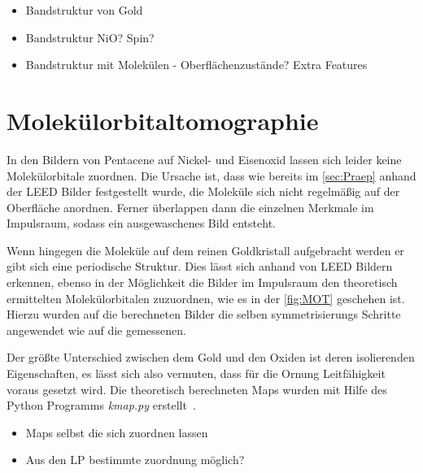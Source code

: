         \begin{itemize}
            \item Bandstruktur von Gold
            \item Bandstruktur NiO? Spin?
            \item Bandstruktur mit Molekülen - Oberflächenzustände? Extra Features
        \end{itemize}

    \section{Molekülorbitaltomographie}
        In den Bildern von Pentacene auf Nickel- und Eisenoxid lassen sich leider keine Molekülorbitale zuordnen.
        Die Ursache ist, dass wie bereits im \autoref{sec:Praep} anhand der LEED Bilder festgestellt wurde, die Moleküle sich nicht regelmäßig auf der Oberfläche anordnen.
        Ferner überlappen dann die einzelnen Merkmale im Impulsraum, sodass ein ausgewaschenes Bild entsteht.

        Wenn hingegen die Moleküle auf dem reinen Goldkristall aufgebracht werden er gibt sich eine periodische Struktur.
        Dies lässt sich anhand von LEED Bildern erkennen, ebenso in der Möglichkeit die Bilder im Impulsraum den theoretisch ermittelten Molekülorbitalen zuzuordnen, wie es in der \autoref{fig:MOT} geschehen ist.
        Hierzu wurden auf die berechneten Bilder die selben symmetrisierungs Schritte angewendet wie auf die gemessenen.

        Der größte Unterschied zwischen dem Gold und den Oxiden ist deren isolierenden Eigenschaften, es lässt sich also vermuten, dass für die Ornung Leitfähigkeit voraus gesetzt wird.
        Die theoretisch berechneten Maps wurden mit Hilfe des Python Programms \textit{kmap.py} erstellt~\cite{brandstetter_kmappy_2021}.

        \begin{itemize}
            \item Maps selbst die sich zuordnen lassen
            \item Aus den LP bestimmte zuordnung möglich?
        \end{itemize}

